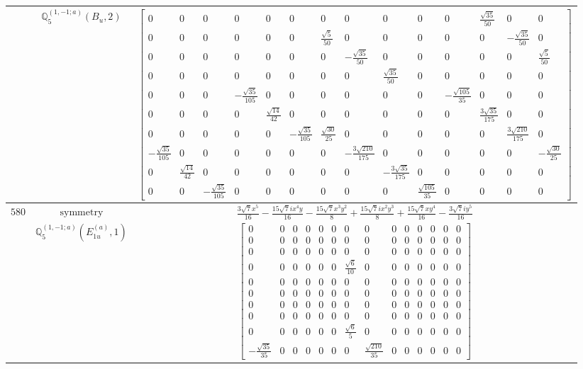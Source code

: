 \documentclass[fleqn,8pt,landscape]{jsarticle}
\begin{document}
\begin{longtable}{ccc}
$  $ & $ \mathbb{Q}_{5}^{(1,-1;a)}(B_{u},2) $ & $ \begin{bmatrix} 0 & 0 & 0 & 0 & 0 & 0 & 0 & 0 & 0 & 0 & 0 & \frac{\sqrt{35}}{50} & 0 & 0 \\ 0 & 0 & 0 & 0 & 0 & 0 & \frac{\sqrt{5}}{50} & 0 & 0 & 0 & 0 & 0 & - \frac{\sqrt{35}}{50} & 0 \\ 0 & 0 & 0 & 0 & 0 & 0 & 0 & - \frac{\sqrt{35}}{50} & 0 & 0 & 0 & 0 & 0 & \frac{\sqrt{5}}{50} \\ 0 & 0 & 0 & 0 & 0 & 0 & 0 & 0 & \frac{\sqrt{35}}{50} & 0 & 0 & 0 & 0 & 0 \\ 0 & 0 & 0 & - \frac{\sqrt{35}}{105} & 0 & 0 & 0 & 0 & 0 & 0 & - \frac{\sqrt{105}}{35} & 0 & 0 & 0 \\ 0 & 0 & 0 & 0 & \frac{\sqrt{14}}{42} & 0 & 0 & 0 & 0 & 0 & 0 & \frac{3 \sqrt{35}}{175} & 0 & 0 \\ 0 & 0 & 0 & 0 & 0 & - \frac{\sqrt{35}}{105} & \frac{\sqrt{30}}{25} & 0 & 0 & 0 & 0 & 0 & \frac{3 \sqrt{210}}{175} & 0 \\ - \frac{\sqrt{35}}{105} & 0 & 0 & 0 & 0 & 0 & 0 & - \frac{3 \sqrt{210}}{175} & 0 & 0 & 0 & 0 & 0 & - \frac{\sqrt{30}}{25} \\ 0 & \frac{\sqrt{14}}{42} & 0 & 0 & 0 & 0 & 0 & 0 & - \frac{3 \sqrt{35}}{175} & 0 & 0 & 0 & 0 & 0 \\ 0 & 0 & - \frac{\sqrt{35}}{105} & 0 & 0 & 0 & 0 & 0 & 0 & \frac{\sqrt{105}}{35} & 0 & 0 & 0 & 0 \end{bmatrix} $ \\ \hline
$ 580 $ & $ \text{symmetry} $ & $ \frac{3 \sqrt{7} x^{5}}{16} - \frac{15 \sqrt{7} i x^{4} y}{16} - \frac{15 \sqrt{7} x^{3} y^{2}}{8} + \frac{15 \sqrt{7} i x^{2} y^{3}}{8} + \frac{15 \sqrt{7} x y^{4}}{16} - \frac{3 \sqrt{7} i y^{5}}{16} $ \\
$  $ & $ \mathbb{Q}_{5}^{(1,-1;a)}(E_{1u}^{(a)},1) $ & $ \begin{bmatrix} 0 & 0 & 0 & 0 & 0 & 0 & 0 & 0 & 0 & 0 & 0 & 0 & 0 & 0 \\ 0 & 0 & 0 & 0 & 0 & 0 & 0 & 0 & 0 & 0 & 0 & 0 & 0 & 0 \\ 0 & 0 & 0 & 0 & 0 & 0 & 0 & 0 & 0 & 0 & 0 & 0 & 0 & 0 \\ 0 & 0 & 0 & 0 & 0 & 0 & \frac{\sqrt{6}}{10} & 0 & 0 & 0 & 0 & 0 & 0 & 0 \\ 0 & 0 & 0 & 0 & 0 & 0 & 0 & 0 & 0 & 0 & 0 & 0 & 0 & 0 \\ 0 & 0 & 0 & 0 & 0 & 0 & 0 & 0 & 0 & 0 & 0 & 0 & 0 & 0 \\ 0 & 0 & 0 & 0 & 0 & 0 & 0 & 0 & 0 & 0 & 0 & 0 & 0 & 0 \\ 0 & 0 & 0 & 0 & 0 & 0 & 0 & 0 & 0 & 0 & 0 & 0 & 0 & 0 \\ 0 & 0 & 0 & 0 & 0 & 0 & \frac{\sqrt{6}}{5} & 0 & 0 & 0 & 0 & 0 & 0 & 0 \\ - \frac{\sqrt{35}}{35} & 0 & 0 & 0 & 0 & 0 & 0 & \frac{\sqrt{210}}{35} & 0 & 0 & 0 & 0 & 0 & 0 \end{bmatrix} $ \\ \hline

\end{longtable}
\end{document}
